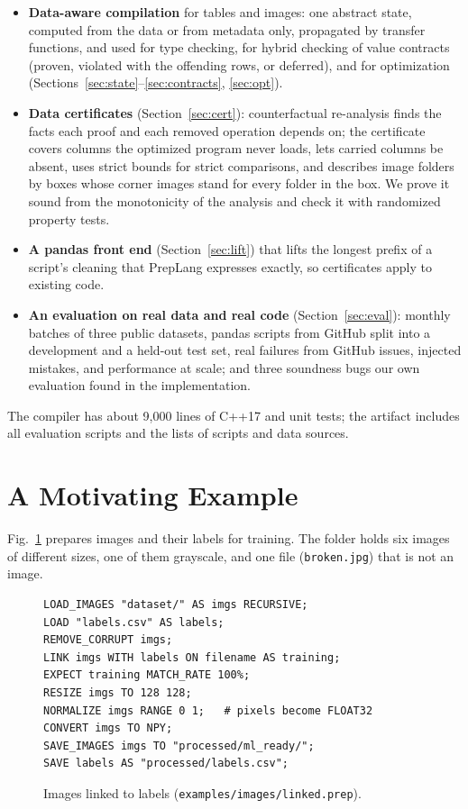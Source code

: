 \documentclass[conference]{IEEEtran}
\begin{document}
\begin{itemize}
\item \textbf{Data-aware compilation} for tables and images: one abstract state, computed from the
data or from metadata only, propagated by transfer functions, and used for type checking, for
hybrid checking of value contracts (proven, violated with the offending rows, or deferred), and for
optimization (Sections~\ref{sec:state}--\ref{sec:contracts}, \ref{sec:opt}).
\item \textbf{Data certificates} (Section~\ref{sec:cert}): counterfactual re-analysis finds the
facts each proof and each removed operation depends on; the certificate covers columns the
optimized program never loads, lets carried columns be absent, uses strict bounds for strict
comparisons, and describes image folders by boxes whose corner images stand for every folder in
the box. We prove it sound from the monotonicity of the analysis and check it with randomized
property tests.
\item \textbf{A pandas front end} (Section~\ref{sec:lift}) that lifts the longest prefix of a
script's cleaning that PrepLang expresses exactly, so certificates apply to existing code.
\item \textbf{An evaluation on real data and real code} (Section~\ref{sec:eval}): monthly batches
of three public datasets, \CorpusAll{} pandas scripts from GitHub split into a development and a
held-out test set, \RbTotal{} real failures from GitHub issues, injected mistakes, and performance
at scale; and three soundness bugs our own evaluation found in the implementation.
\end{itemize}

The compiler has about 9,000 lines of C++17 and \TestCount{} unit tests; the artifact includes all
evaluation scripts and the lists of scripts and data sources.

\section{A Motivating Example}\label{sec:example}

Fig.~\ref{fig:linked} prepares images and their labels for training. The folder holds six images of
different sizes, one of them grayscale, and one file (\texttt{broken.jpg}) that is not an image.

\begin{figure}[t]
\begin{lstlisting}
LOAD_IMAGES "dataset/" AS imgs RECURSIVE;
LOAD "labels.csv" AS labels;
REMOVE_CORRUPT imgs;
LINK imgs WITH labels ON filename AS training;
EXPECT training MATCH_RATE 100%;
RESIZE imgs TO 128 128;
NORMALIZE imgs RANGE 0 1;   # pixels become FLOAT32
CONVERT imgs TO NPY;
SAVE_IMAGES imgs TO "processed/ml_ready/";
SAVE labels AS "processed/labels.csv";
\end{lstlisting}
\caption{Images linked to labels (\texttt{examples/images/linked.prep}).}
\label{fig:linked}
\end{figure}
\end{document}
